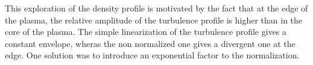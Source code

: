 \documentclass[11pt,a4paper,openany]{report}
\begin{document}
\begin{multicols}{2}



    This exploration of the density profile is motivated by the fact that at the edge of the plasma, the relative amplitude of the turbulence profile is higher than in the core of the plasma.
    The simple linearization of the turbulence profile gives a constant envelope, wheras the non normalized one gives a divergent one at the edge. One solution was to introduce an exponential factor to the normalization.



\end{multicols}
\end{document}
